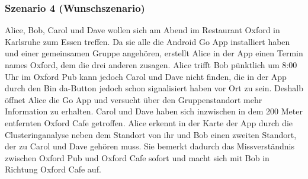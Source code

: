 \documentclass{scrartcl}
\begin{document}
	\subsubsection{Szenario 4 (Wunschszenario)}
	Alice, Bob, Carol und Dave wollen sich am Abend im Restaurant Oxford in Karlsruhe zum Essen treffen. 
	Da sie alle die Android Go App installiert haben und einer gemeinsamen Gruppe angehören, erstellt Alice in der App 		einen Termin names \glqq{}Oxford\grqq{}, dem die drei anderen zusagen. Alice trifft Bob pünktlich um 8:00 Uhr im 		\glqq{}Oxford Pub\glqq{} kann jedoch Carol und Dave nicht finden, die in der App durch den \glqq{}Bin da\glqq{}-Button 		jedoch schon signalisiert haben vor Ort zu sein. Deshalb öffnet Alice die Go App und versucht über den Gruppenstandort 		mehr Information zu erhalten. Carol und Dave haben sich inzwischen in dem 200 Meter entfernten \glqq{}Oxford 			Cafe\glqq{} getroffen. Alice erkennt in der Karte der App durch die Clusteringanalyse neben dem Standort von ihr und 		Bob einen zweiten Standort, der zu Carol und Dave gehören muss. Sie bemerkt dadurch das Missverständnis zwischen 		\glqq{}Oxford Pub\glqq{} und \glqq{}Oxford Cafe\glqq{} sofort und macht sich mit Bob in Richtung \glqq{}Oxford 			Cafe\glqq{} auf.    
	
	
	
	
	
	
	
	
	\newpage
	
\end{document}
